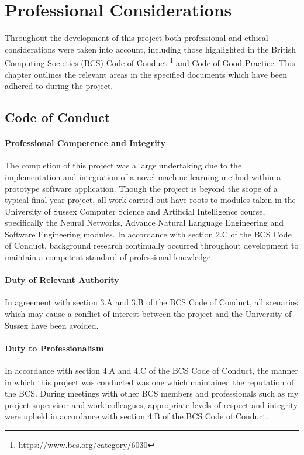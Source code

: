 \chapter{Professional Considerations}
\label{prof_con}
Throughout the development of this project both professional and ethical considerations were taken into account, including those highlighted in the British Computing Societies (BCS) Code of Conduct \footnote{https://www.bcs.org/category/6030} and Code of Good Practice. This chapter outlines the relevant areas in the specified documents which have been adhered to during the project.

\section{Code of Conduct}
\subsubsection{Professional Competence and Integrity}
The completion of this project was a large undertaking due to the implementation and integration of a novel machine learning method within a prototype software application. Though the project is beyond the scope of a typical final year project, all work carried out have roots to modules taken in the University of Sussex Computer Science and Artificial Intelligence course, specifically the Neural Networks, Advance Natural Language Engineering and Software Engineering modules. In accordance with section 2.C of the BCS Code of Conduct, background research continually occurred throughout development to maintain a competent standard of professional knowledge.

\subsubsection{Duty of Relevant Authority}
In agreement with section 3.A and 3.B of the BCS Code of Conduct, all scenarios which may cause a conflict of interest between the project and the University of Sussex have been avoided.

\subsubsection{Duty to Professionalism}
In accordance with section 4.A and 4.C of the BCS Code of Conduct, the manner in which this project was conducted was one which maintained the reputation of the BCS. During meetings with other BCS members and professionals such as my project supervisor and work colleagues, appropriate levels of respect and integrity were upheld in accordance with section 4.B of the BCS Code of Conduct.

